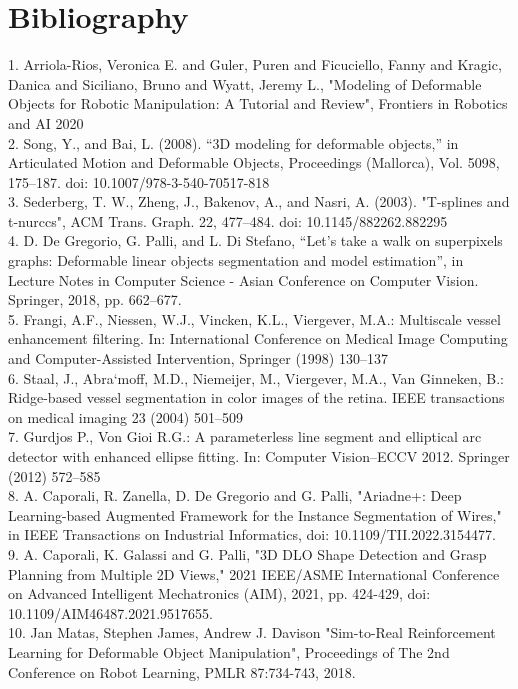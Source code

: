 \documentclass[12pt,a4paper]{report}
\begin{document}
\chapter*{Bibliography}
1. Arriola-Rios, Veronica E. and Guler, Puren and Ficuciello, Fanny and Kragic, Danica and Siciliano, Bruno and Wyatt, Jeremy L., "Modeling of Deformable Objects for Robotic Manipulation: A Tutorial and Review", Frontiers in Robotics and AI 2020\\
2. Song, Y., and Bai, L. (2008). “3D modeling for deformable objects,” in Articulated Motion and Deformable Objects, Proceedings (Mallorca), Vol. 5098, 175–187. doi: 10.1007/978-3-540-70517-818\\
3. Sederberg, T. W., Zheng, J., Bakenov, A., and Nasri, A. (2003). "T-splines and t-nurccs", ACM Trans. Graph. 22, 477–484. doi: 10.1145/882262.882295\\
4. D. De Gregorio, G. Palli, and L. Di Stefano, “Let’s take a walk on superpixels graphs: Deformable linear objects segmentation and model estimation”, in Lecture Notes in Computer Science - Asian Conference on Computer Vision. Springer, 2018, pp. 662–677.\\
5. Frangi, A.F., Niessen, W.J., Vincken, K.L., Viergever, M.A.: Multiscale vessel
enhancement filtering. In: International Conference on Medical Image Computing
and Computer-Assisted Intervention, Springer (1998) 130–137\\
6. Staal, J., Abra`moff, M.D., Niemeijer, M., Viergever, M.A., Van Ginneken, B.:
Ridge-based vessel segmentation in color images of the retina. IEEE transactions
on medical imaging 23 (2004) 501–509\\
7. Gurdjos P., Von Gioi R.G.: A parameterless line segment and
elliptical arc detector with enhanced ellipse fitting. In: Computer Vision–ECCV
2012. Springer (2012) 572–585\\
8. A. Caporali, R. Zanella, D. De Gregorio and G. Palli, "Ariadne+: Deep Learning-based Augmented Framework for the Instance Segmentation of Wires," in IEEE Transactions on Industrial Informatics, doi: 10.1109/TII.2022.3154477. \\
9. A. Caporali, K. Galassi and G. Palli, "3D DLO Shape Detection and Grasp Planning from Multiple 2D Views," 2021 IEEE/ASME International Conference on Advanced Intelligent Mechatronics (AIM), 2021, pp. 424-429, doi: 10.1109/AIM46487.2021.9517655.\\
10. Jan Matas, Stephen James, Andrew J. Davison "Sim-to-Real Reinforcement Learning for Deformable Object Manipulation", Proceedings of The 2nd Conference on Robot Learning, PMLR 87:734-743, 2018.\\
\end{document}

